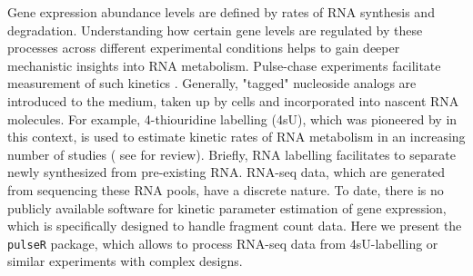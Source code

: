 Gene expression abundance levels are defined by rates of RNA synthesis and degradation.
Understanding how certain gene levels are regulated by these processes across different
experimental conditions helps to gain deeper mechanistic insights into RNA metabolism.
Pulse-chase experiments facilitate measurement of  such kinetics \citep{Wachutka2016}. 
Generally, "tagged" nucleoside analogs are introduced to the medium, 
taken up by cells and incorporated into nascent RNA molecules.
For example, 4-thiouridine labelling (4sU), which was pioneered by \cite{dolken2008high} in this context, is used to estimate 
kinetic rates of RNA metabolism in an increasing number of studies ( 
see \cite{Wachutka2016} for review). Briefly, RNA labelling facilitates to separate newly synthesized from pre-existing RNA.
RNA-seq data, which are generated from sequencing these RNA pools, have a discrete nature.
To date, there is no publicly available software for kinetic parameter estimation of gene expression, which is specifically designed to handle 
fragment count data. Here we present the \verb|pulseR| package, which allows to 
process RNA-seq data from 4sU-labelling or similar experiments with complex designs.
